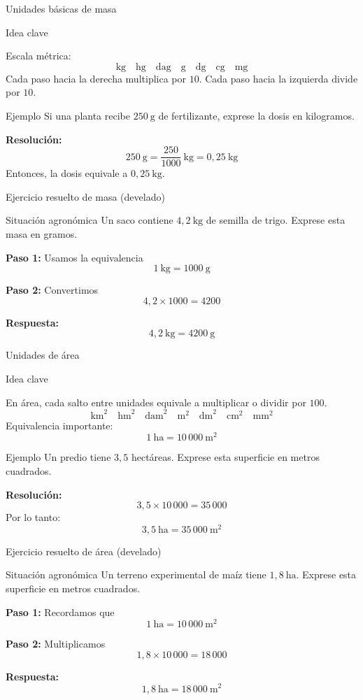 \documentclass[handout,aspectratio=169,10pt]{beamer}
\newcommand{\idea}[1]{
	\begin{block}{Idea clave}
		#1
	\end{block}
}
\newcommand{\ejemplo}[2]{
	\begin{exampleblock}{Ejemplo}
		#1
		
		\vspace{0.5em}
		\textbf{Resolución:} #2
	\end{exampleblock}
}
\begin{document}
	\begin{frame}{Unidades básicas de masa}
		\idea{
			Escala métrica:
			\[
			\text{kg}\quad \text{hg}\quad \text{dag}\quad \text{g}\quad \text{dg}\quad \text{cg}\quad \text{mg}
			\]
			Cada paso hacia la derecha multiplica por \(10\).  
			Cada paso hacia la izquierda divide por \(10\).
		}
		
		\pause
		\ejemplo
		{Si una planta recibe \(250\ \text{g}\) de fertilizante, exprese la dosis en kilogramos.}
		{
			\[
			250\ \text{g} = \frac{250}{1000}\ \text{kg} = 0{,}25\ \text{kg}
			\]
			Entonces, la dosis equivale a \(\boxed{0{,}25\ \text{kg}}\).
		}
	\end{frame}
	
	\begin{frame}{Ejercicio resuelto de masa (develado)}
		\begin{block}{Situación agronómica}
			Un saco contiene \(4{,}2\ \text{kg}\) de semilla de trigo.  
			Exprese esta masa en gramos.
		\end{block}
		
		\pause
		\textbf{Paso 1:} Usamos la equivalencia
		\[
		1\ \text{kg} = 1000\ \text{g}
		\]
		
		\pause
		\textbf{Paso 2:} Convertimos
		\[
		4{,}2 \times 1000 = 4200
		\]
		
		\pause
		\textbf{Respuesta:}
		\[
		4{,}2\ \text{kg} = \boxed{4200\ \text{g}}
		\]
	\end{frame}
	
	\begin{frame}{Unidades de área}
		\idea{
			En área, cada salto entre unidades equivale a multiplicar o dividir por \(100\).
			\[
			\text{km}^2 \quad \text{hm}^2 \quad \text{dam}^2 \quad \text{m}^2 \quad \text{dm}^2 \quad \text{cm}^2 \quad \text{mm}^2
			\]
			Equivalencia importante:
			\[
			1\ \text{ha} = 10\,000\ \text{m}^2
			\]
		}
		
		\pause
		\ejemplo
		{Un predio tiene \(3{,}5\) hectáreas. Exprese esta superficie en metros cuadrados.}
		{
			\[
			3{,}5 \times 10\,000 = 35\,000
			\]
			Por lo tanto:
			\[
			3{,}5\ \text{ha} = \boxed{35\,000\ \text{m}^2}
			\]
		}
	\end{frame}
	
	\begin{frame}{Ejercicio resuelto de área (develado)}
		\begin{block}{Situación agronómica}
			Un terreno experimental de maíz tiene \(1{,}8\ \text{ha}\).  
			Exprese esta superficie en metros cuadrados.
		\end{block}
		
		\pause
		\textbf{Paso 1:} Recordamos que
		\[
		1\ \text{ha} = 10\,000\ \text{m}^2
		\]
		
		\pause
		\textbf{Paso 2:} Multiplicamos
		\[
		1{,}8 \times 10\,000 = 18\,000
		\]
		
		\pause
		\textbf{Respuesta:}
		\[
		1{,}8\ \text{ha} = \boxed{18\,000\ \text{m}^2}
		\]
	\end{frame}
	
\end{document}
